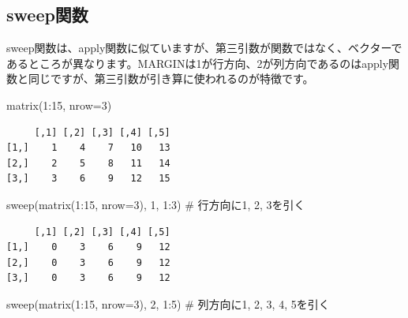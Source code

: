\documentclass[
  letterpaper,
  DIV=11,
  numbers=noendperiod]{scrreprt}
\newenvironment{Shaded}{\begin{snugshade}}{\end{snugshade}}
\newcommand{\AttributeTok}[1]{\textcolor[rgb]{0.40,0.45,0.13}{#1}}
\newcommand{\CommentTok}[1]{\textcolor[rgb]{0.37,0.37,0.37}{#1}}
\newcommand{\DecValTok}[1]{\textcolor[rgb]{0.68,0.00,0.00}{#1}}
\newcommand{\FunctionTok}[1]{\textcolor[rgb]{0.28,0.35,0.67}{#1}}
\newcommand{\NormalTok}[1]{\textcolor[rgb]{0.00,0.23,0.31}{#1}}
\newcommand{\SpecialCharTok}[1]{\textcolor[rgb]{0.37,0.37,0.37}{#1}}
\begin{document}
\hypertarget{sweepux95a2ux6570}{%
\subsection{sweep関数}\label{sweepux95a2ux6570}}

sweep関数は、apply関数に似ていますが、第三引数が関数ではなく、ベクターであるところが異なります。MARGINは1が行方向、2が列方向であるのはapply関数と同じですが、第三引数が引き算に使われるのが特徴です。

\begin{Shaded}
\begin{Highlighting}[]
\FunctionTok{matrix}\NormalTok{(}\DecValTok{1}\SpecialCharTok{:}\DecValTok{15}\NormalTok{, }\AttributeTok{nrow=}\DecValTok{3}\NormalTok{)}
\end{Highlighting}
\end{Shaded}

\begin{verbatim}
     [,1] [,2] [,3] [,4] [,5]
[1,]    1    4    7   10   13
[2,]    2    5    8   11   14
[3,]    3    6    9   12   15
\end{verbatim}

\begin{Shaded}
\begin{Highlighting}[]
\FunctionTok{sweep}\NormalTok{(}\FunctionTok{matrix}\NormalTok{(}\DecValTok{1}\SpecialCharTok{:}\DecValTok{15}\NormalTok{, }\AttributeTok{nrow=}\DecValTok{3}\NormalTok{), }\DecValTok{1}\NormalTok{, }\DecValTok{1}\SpecialCharTok{:}\DecValTok{3}\NormalTok{) }\CommentTok{\# 行方向に1, 2, 3を引く}
\end{Highlighting}
\end{Shaded}

\begin{verbatim}
     [,1] [,2] [,3] [,4] [,5]
[1,]    0    3    6    9   12
[2,]    0    3    6    9   12
[3,]    0    3    6    9   12
\end{verbatim}

\begin{Shaded}
\begin{Highlighting}[]
\FunctionTok{sweep}\NormalTok{(}\FunctionTok{matrix}\NormalTok{(}\DecValTok{1}\SpecialCharTok{:}\DecValTok{15}\NormalTok{, }\AttributeTok{nrow=}\DecValTok{3}\NormalTok{), }\DecValTok{2}\NormalTok{, }\DecValTok{1}\SpecialCharTok{:}\DecValTok{5}\NormalTok{) }\CommentTok{\# 列方向に1, 2, 3, 4, 5を引く}
\end{Highlighting}
\end{Shaded}
\end{document}
